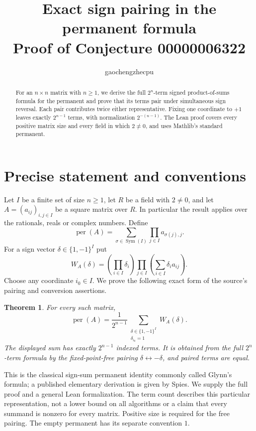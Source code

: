 \documentclass[11pt]{article}
\title{Exact sign pairing in the permanent formula\\
\large Proof of Conjecture 00000006322}
\author{gaochengzhecpu}\date{}
\newtheorem{theorem}{Theorem}
\newcommand{\per}{\operatorname{per}}
\begin{document}
\maketitle
\begin{abstract}
For an $n\times n$ matrix with $n\ge1$, we derive the full
$2^n$-term signed product-of-sums formula for the permanent and
prove that its terms pair under simultaneous sign reversal.
Each pair contributes twice either representative. Fixing one
coordinate to $+1$ leaves exactly $2^{n-1}$ terms, with normalization
$2^{-(n-1)}$. The Lean proof covers every positive matrix size and
every field in which $2\ne0$, and uses Mathlib's standard permanent.
\end{abstract}

\section*{Precise statement and conventions}
Let $I$ be a finite set of size $n\ge1$, let $R$ be a field with
$2\ne0$, and let $A=(a_{ij})_{i,j\in I}$ be a square matrix over $R$.
In particular the result applies over the rationals, reals or
complex numbers. Define
\[
 \per(A)=\sum_{\sigma\in\operatorname{Sym}(I)}
                 \prod_{j\in I}a_{\sigma(j),j}.
\]
For a sign vector $\delta\in\{1,-1\}^I$ put
\[
 W_A(\delta)=\left(\prod_{i\in I}\delta_i\right)
                 \prod_{j\in I}\left(\sum_{i\in I}\delta_i a_{ij}\right).
\]
Choose any coordinate $i_0\in I$. We prove the following exact
form of the source's pairing and conversion assertions.

\begin{theorem}\label{thm:main}
For every such matrix,
\[
 \boxed{\displaystyle
 \per(A)=\frac{1}{2^{n-1}}
       \sum_{\substack{\delta\in\{1,-1\}^I\\\delta_{i_0}=1}}W_A(\delta).}
\]
The displayed sum has exactly $2^{n-1}$ indexed terms. It is obtained
from the full $2^n$-term formula by the fixed-point-free pairing
$\delta\leftrightarrow-\delta$, and paired terms are equal.
\end{theorem}

This is the classical sign-sum permanent identity commonly called
Glynn's formula; a published elementary derivation is given by
Spies. We supply the full proof and a general Lean formalization.
The term count describes this particular representation, not a
lower bound on all algorithms or a claim that every summand is
nonzero for every matrix. Positive size is required for the free
pairing. The empty permanent has its separate convention $1$.
\end{document}
